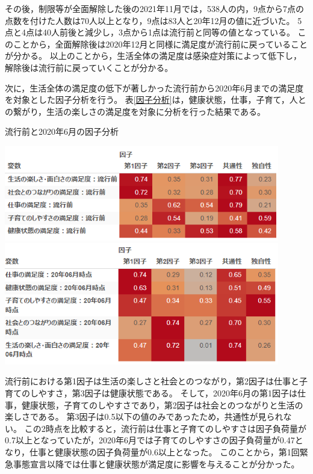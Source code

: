 \documentclass[paper={210mm,297mm},fontsize=15Q,line_length=35zw,number_of_lines=31,head_space=30mm,gutter=40mm,baselineskip=2.0zw,headfoot_verticalposition=1.5zw]{jlreq}
\begin{document}
その後，制限等が全面解除した後の2021年11月では，538人の内，9点から7点の点数を付けた人数は70人以上となり，9点は83人と20年12月の値に近づいた。
5点と4点は40人前後と減少し，3点から1点は流行前と同等の値となっている。
このことから，全面解除後は2020年12月と同様に満足度が流行前に戻っていることが分かる。
以上のことから，生活全体の満足度は感染症対策によって低下し，解除後は流行前に戻っていくことが分かる。

次に，生活全体の満足度の低下が著しかった流行前から2020年6月までの満足度を対象とした因子分析を行う。
表\ref{因子分析}は，健康状態，仕事，子育て，人との繋がり，生活の楽しさの満足度を対象に分析を行った結果である。

\begin{table}[H]
  \centering
  \caption{流行前と2020年6月の因子分析}
  \includegraphics[width=120mm]{../Figure/c05s01_table_因子分析_流行前.png}
  \includegraphics[width=120mm]{../Figure/c05s01_table_因子分析_緊急事態宣言.png}
  \label{因子分析}
\end{table}

流行前における第1因子は生活の楽しさと社会とのつながり，第2因子は仕事と子育てのしやすさ，第3因子は健康状態である。
そして，2020年6月の第1因子は仕事，健康状態，子育てのしやすさであり，第2因子は社会とのつながりと生活の楽しさである。
第3因子は0.5以下の値のみであったため，共通性が見られない。
この2時点を比較すると，流行前は仕事と子育てのしやすさは因子負荷量が0.7以上となっていたが，2020年6月では子育てのしやすさの因子負荷量が0.47となり，仕事と健康状態の因子負荷量が0.6以上となった。
このことから，第1回緊急事態宣言以降では仕事と健康状態が満足度に影響を与えることが分かった。
\end{document}

